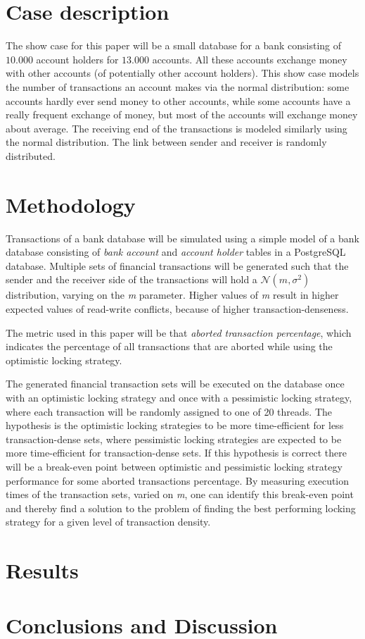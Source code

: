 \documentclass{sig-alternate-br}
\begin{document}
\section{Case description}
\label{sec:case}
The show case for this paper will be a small database for a bank consisting of $10.000$ account holders for $13.000$ accounts. All these accounts exchange money with other accounts (of potentially other account holders). This show case models the number of transactions an account makes via the normal distribution: some accounts hardly ever send money to other accounts, while some accounts have a really frequent exchange of money, but most of the accounts will exchange money about average. The receiving end of the transactions is modeled similarly using the normal distribution. The link between sender and receiver is randomly distributed.

\section{Methodology}
\label{sec:methodology}
Transactions of a bank database will be simulated using a simple model of a bank database consisting of \emph{bank account} and \emph{account holder} tables in a PostgreSQL database. Multiple sets of financial transactions will be generated such that the sender and the receiver side of the transactions will hold a $\mathcal{N} (m,\sigma^2)$ distribution, varying on the \emph{m} parameter. Higher values of \emph{m} result in higher expected values of read-write conflicts, because of higher transaction-denseness. 

The metric used in this paper will be that \emph{aborted transaction percentage}, which indicates the percentage of all transactions that are aborted while using the optimistic locking strategy.

The generated financial transaction sets will be executed on the database once with an optimistic locking strategy and once with a pessimistic locking strategy, where each transaction will be randomly assigned to one of 20 threads. The hypothesis is the optimistic locking strategies to be more time-efficient for less transaction-dense sets, where pessimistic locking strategies are expected to be more time-efficient for transaction-dense sets. If this hypothesis is correct there will be a break-even point between optimistic and pessimistic locking strategy performance for some aborted transactions percentage. By measuring execution times of the transaction sets, varied on \emph{m}, one can identify this break-even point and thereby find a solution to the problem of finding the best performing locking strategy for a given level of transaction density.

\section{Results}
\label{sec:results}

\section{Conclusions and Discussion}
\label{sec:conclusions}


%


\balancecolumns

\onecolumn
\end{document}
